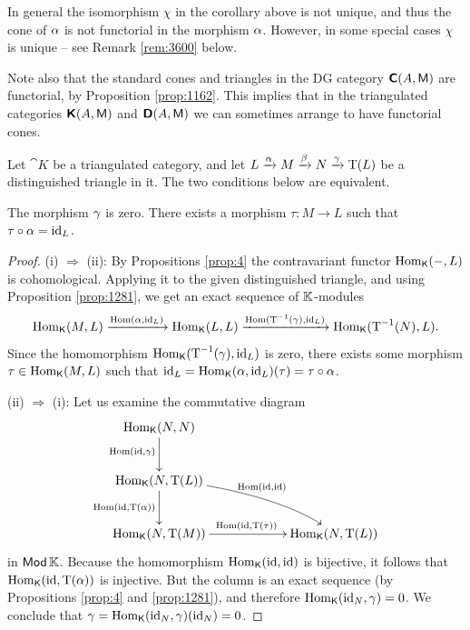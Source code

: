 \begin{rem} \label{rem:4160}
In general the isomorphism $\chi$ in the corollary above is not unique, and 
thus the cone of $\alpha$ is not functorial in the morphism $\alpha$. However, in 
some special cases $\chi$ is unique -- see Remark \ref{rem:3600} below. 

Note also that the standard cones and triangles in the DG category 
$\boldsymbol{\mathsf{C}}(A, \operatorname{\mathsf{M}})$ are functorial, by Proposition \ref{prop:1162}.
This implies that in the triangulated categories 
$\boldsymbol{\mathsf{K}}(A, \operatorname{\mathsf{M}})$ and $\boldsymbol{\mathsf{D}}(A, \operatorname{\mathsf{M}})$
we can sometimes arrange to have functorial cones.
\end{rem}

\begin{prop} \label{prop:3605}
Let $\cat{K}$ be a triangulated category, and let
$L \xrightarrow{\alpha} M \xrightarrow{\beta} N \xrightarrow{\gamma} \operatorname{T}(L)$ 
be a distinguished triangle in it.
The two conditions below are equivalent.  
\begin{enumerate}
 The morphism $\gamma$ is zero.
 There exists a morphism 
$\tau : M \to L$ such that $\tau \circ \alpha = \operatorname{id}_L$. 
\end{enumerate}
\end{prop}

\begin{proof} \mbox{}

\smallskip \noindent
(i) $\Rightarrow$ (ii): By Propositions \ref{prop:4} the contravariant functor 
$\operatorname{Hom}_{\operatorname{\mathsf{K}}}(-, L)$ is cohomological. Applying it to the given 
distinguished triangle, and using Proposition \ref{prop:1281}, we get  
an exact sequence of $\mathbb{K}$-modules 
\[ \operatorname{Hom}_{\operatorname{\mathsf{K}}}(M, L) \xrightarrow{\operatorname{Hom}(\alpha, \operatorname{id}_L)}  
\operatorname{Hom}_{\operatorname{\mathsf{K}}}(L, L) \xrightarrow{\operatorname{Hom}(\operatorname{T}^{-1}(\gamma), \operatorname{id}_L)}
\operatorname{Hom}_{\operatorname{\mathsf{K}}}(\operatorname{T}^{-1}(N), L) . \]
Since the homomorphism 
$\operatorname{Hom}_{\operatorname{\mathsf{K}}}(\operatorname{T}^{-1}(\gamma), \operatorname{id}_L)$ is zero, 
there exists some morphism $\tau \in \operatorname{Hom}_{\operatorname{\mathsf{K}}}(M, L)$
such that 
$\operatorname{id}_L = \operatorname{Hom}_{\operatorname{\mathsf{K}}}(\alpha, \operatorname{id}_L)(\tau) = \tau \circ \alpha$.

\medskip \noindent 
(ii) $\Rightarrow$ (i):
Let us examine the commutative diagram 
\[ \UseTips  \xymatrix @C=14ex @R=6ex { 
\opn{Hom}_{\cat{K}}(N, N)
\ar[d]_(0.45){\opn{Hom}(\opn{id}, \ga)}
\\
\opn{Hom}_{\cat{K}}(N, \opn{T}(L))
\ar[d]_{\opn{Hom}(\opn{id}, \opn{T}(\al))}
\ar@(r,ul)[dr]^{ \ \opn{Hom}(\opn{id}, \opn{id})}
\\
\opn{Hom}_{\cat{K}}(N, \opn{T}(M))
\ar[r]^{\opn{Hom}(\opn{id}, \opn{T}(\tau))}
&
\opn{Hom}_{\cat{K}}(N, \opn{T}(L))
}  \]
in $\operatorname{\mathsf{Mod}} \mathbb{K}$. Because the homomorphism 
$\operatorname{Hom}_{\operatorname{\mathsf{K}}}(\operatorname{id}, \operatorname{id})$
is bijective, it follows that 
$\operatorname{Hom}_{\operatorname{\mathsf{K}}}(\operatorname{id}, \operatorname{T}(\alpha))$
is injective. But the column is an exact sequence (by Propositions \ref{prop:4} 
and \ref{prop:1281}), and therefore 
$\operatorname{Hom}_{\operatorname{\mathsf{K}}}(\operatorname{id}_{N}, \gamma) = 0$. We conclude that
$\gamma = \operatorname{Hom}_{\operatorname{\mathsf{K}}}(\operatorname{id}_{N}, \gamma)(\operatorname{id}_{N}) = 0$.
\end{proof}

